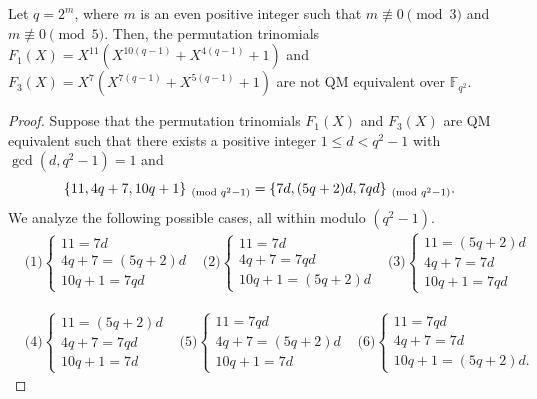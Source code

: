 \documentclass[10pt,a4paper]{amsart}
\newcommand{\F}{\mathbb F}
\begin{document}
\begin{prop}{\label{prop1}}
Let $q=2^m$, where $m$ is an even positive integer such that $m\not\equiv0\pmod{3}$ and $m\not\equiv0\pmod{5}$. Then, the permutation trinomials $F_1(X)=X^{11}(X^{10(q-1)} + X^{4(q-1)} + 1)$ and $F_3(X)=X^{7}( X^{7(q-1)} + X^{5(q-1)} + 1)$ are not QM equivalent over $\F_{q^2}$.
\end{prop}

\begin{proof}
Suppose that the permutation trinomials $F_1(X)$ and $F_3(X)$ are QM equivalent such that there exists a positive integer $1 \leq d < q^2-1$ with $\gcd(d,q^2-1)=1$ and   
\begin{equation}{\label{1eq}}
\{11,4q+7,10q+1\}_{\pmod{q^2-1}}=\{7d,(5q+2)d,7qd\}_{\pmod{q^2-1}}.
\end{equation}
We analyze the following possible cases, all within modulo $(q^2 - 1)$.
    \begin{align*}
        & \text{(1)} \begin{cases}
			11=7d\\
			4q+7=(5q+2)d\\
			10q+1=7qd
		\end{cases} 
        & \text{(2)}  \begin{cases}
			11=7d\\
			4q+7=7qd\\
                10q+1=(5q+2)d
		\end{cases} 
        & \text{(3)}  \begin{cases}
			11=(5q+2)d\\
			4q+7=7d\\
			10q+1=7qd
		\end{cases} 
        \end{align*}
        
\begin{align*}
 & \text{(4)} \begin{cases}
		11=(5q+2)d\\
		4q+7=7qd\\
		10q+1=7d
\end{cases}  
& \text{(5)} \begin{cases}
		11=7qd\\
		4q+7=(5q+2)d\\
		10q+1=7d
\end{cases} 
        &\text{(6)} \begin{cases}
			11=7qd\\
			4q+7=7d\\
			10q+1=(5q+2)d.
		\end{cases}
    \end{align*}
    

\end{proof}
\end{document}
